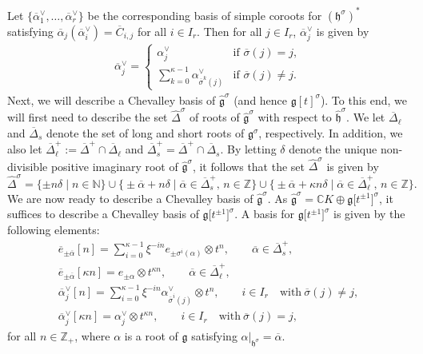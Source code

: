 \documentclass[pdftex]{sigma}
\numberwithin{equation}{section}
\begin{document}
Let $\{\overline{\alpha}_1^{\vee},\dots, \overline{\alpha}_r^{\vee}\}$ be the corresponding basis of simple coroots for $(\mathfrak{h}^{\sigma})^*$ satisfying $\overline{\alpha}_j(\overline{\alpha}_i^{\vee})=\overline{C}_{i,j}$ for all $i\in I_r$. Then for all $j\in I_r$, $\overline{\alpha}_j^{\vee}$ is given by
\begin{gather*}
\overline{\alpha}_j^{\vee}=
\begin{cases}
\alpha_j^{\vee} & \text{if }\overline{\sigma}(j)=j,\\
\displaystyle \sum_{k=0}^{\kappa-1}\alpha_{\overline{\sigma}^k(j)}^{\vee} & \text{if }\overline{\sigma}(j)\neq j.
\end{cases}
\end{gather*}
Next, we will describe a Chevalley basis of $\widehat{\mathfrak{g}}^{\sigma}$ (and hence $\mathfrak{g}[t]^{\sigma}$). To this end, we will first need to describe the set $\widehat{\Delta}^{\sigma}$ of roots of $\widehat{\mathfrak{g}}^{\sigma}$ with respect to $\widehat{\mathfrak{h}}^{\sigma}$. We let $\overline{\Delta}_{\ell}$ and $\overline{\Delta}_s$ denote the set of long and short roots of $\mathfrak{g}^{\sigma}$, respectively. In addition, we also let $\overline{\Delta}_{\ell}^+:= \overline{\Delta}^+ \cap \overline{\Delta}_{\ell}$ and $\overline{\Delta}_s^+= \overline{\Delta}^+\cap\overline{\Delta}_s$. By letting $\delta$ denote the unique non-divisible positive imaginary root of $\widehat{\mathfrak{g}}^{\sigma}$, it follows that the set $\widehat{\Delta}^{\sigma}$ is given by
\[
\widehat{\Delta}^{\sigma}=\{\pm n\delta\mid n\in\mathbb{N}\}\cup\bigl\{\pm\overline{\alpha}+ n\delta\mid \overline{\alpha}\in\overline{\Delta}_s^+,\,n\in\mathbb{Z}\bigr\}\cup\bigl\{\pm\overline{\alpha}+\kappa n\delta\mid \overline{\alpha}\in\overline{\Delta}_{\ell}^+,\,n\in\mathbb{Z}\bigr\}.
\]
We are now ready to describe a Chevalley basis of $\widehat{\mathfrak{g}}^{\sigma}$. As $\widehat{\mathfrak{g}}^{\sigma}=\mathbb{C}K\oplus\mathfrak{g}\bigl[t^{\pm1}\bigr]^{\sigma}$, it suffices to describe a Chevalley basis of $\mathfrak{g}\bigl[t^{\pm1}\bigr]^{\sigma}$. A basis for $\mathfrak{g}\bigl[t^{\pm1}\bigr]^{\sigma}$ is given by the following elements:
\begin{gather*}
\overline{e}_{\pm\overline{\alpha}}[n]=\sum_{i=0}^{\kappa-1}\xi^{-in}e_{\pm\sigma^i(\alpha)}\otimes t^n,\qquad\overline{\alpha}\in\overline{\Delta}_s^+,\\
\overline{e}_{\pm\overline{\alpha}}[\kappa n]=e_{\pm\alpha}\otimes t^{\kappa n},\qquad\overline{\alpha}\in \overline{\Delta}_{\ell}^+,\\
\overline{\alpha}_j^{\vee}[n]=\sum_{i=0}^{\kappa-1}\xi^{-in}\alpha_{\overline{\sigma}^i(j)}^{\vee}\otimes t^n,\qquad i\in I_r\quad\text{with}\ \overline{\sigma}(j)\neq j,\\
\overline{\alpha}_j^{\vee}[\kappa n]=\alpha_j^{\vee}\otimes t^{\kappa n},\qquad i\in I_r\quad\text{with}\ \overline{\sigma}(j)= j,
\end{gather*}
for all $n\in\mathbb{Z}_+$, where $\alpha$ is a root of $\mathfrak{g}$ satisfying $\alpha|_{\mathfrak{h}^{\sigma}} =\overline{\alpha}$.
\end{document}
